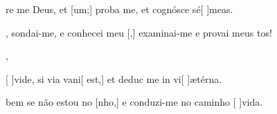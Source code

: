{  {\item {}re me Deus, et [um;] proba me, et cognósce sé[ ]{me}as.~\Antiphona}%
    {\item {}, sondai-me, e conhecei meu [,] examinai-me e provai meus tos!~\Antiphona},
  {\item {}[ ]{vi}de, si via vani[ est,] et deduc me in vi[ ]{æ}{tér}na.~\Antiphona}%
    {\item {} bem se não estou no [nho,] e con\-du\-zi-me no caminho [ ]{vi}da.~\Antiphona}
}
